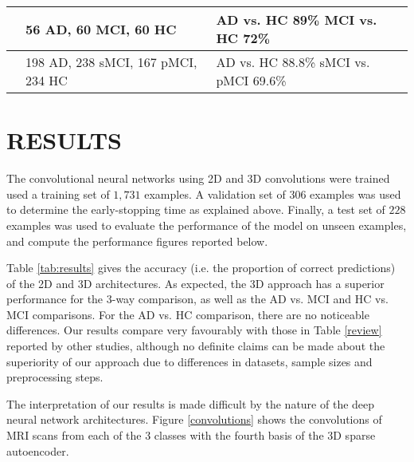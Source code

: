 \documentclass[a4paper,10pt]{article}
\begin{document}
\begin{table*}
\begin{tabular}{p{30mm} | p{50mm} | p{65mm}}
	\cite{batmanghelich} & 56 AD, 60 MCI, 60 HC & AD vs. HC 89\% \newline MCI vs. HC 72\% \\ \hline
	\cite{instance} & 198 AD, 238 sMCI, 167 pMCI, 234 HC & AD vs. HC 88.8\% \newline sMCI vs. pMCI 69.6\%
\end{tabular}
\end{table*}


\section{\uppercase{Results}}
\label{sec:results}

\noindent The convolutional neural networks using 2D and 3D convolutions were trained used a training set of $1,731$ examples. A validation set of $306$ examples was used to determine the early-stopping time as explained above. Finally, a test set of $228$ examples was used to evaluate the performance of the model on unseen examples, and compute the performance figures reported below.

Table \ref{tab:results} gives the accuracy (i.e. the proportion of correct predictions) of the 2D and 3D architectures. As expected, the 3D approach has a superior performance for the 3-way comparison, as well as the AD vs. MCI and HC vs. MCI comparisons. For the AD vs. HC comparison, there are no noticeable differences. Our results compare very favourably with those in Table \ref{review} reported by other studies, although no definite claims can be made about the superiority of our approach due to differences in datasets, sample sizes and preprocessing steps. 

The interpretation of our results is made difficult by the nature of the deep neural network architectures. Figure \ref{convolutions} shows the convolutions of MRI scans from each of the 3 classes with the fourth basis of the 3D sparse autoencoder.
\end{document}

